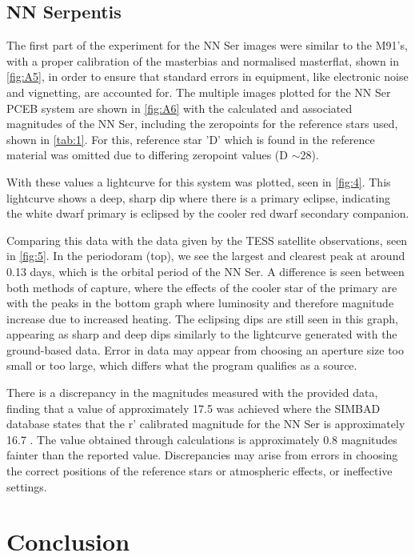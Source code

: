 \documentclass[11pt, a4paper, twocolumn]{article}
\begin{document}
\subsection{NN Serpentis}

The first part of the experiment for the NN Ser images were similar to the M91's, with a proper calibration of the masterbias and normalised masterflat, shown in \autoref{fig:A5}, in order to ensure that standard errors in equipment, like electronic noise and vignetting, are accounted for. The multiple images plotted for the NN Ser PCEB system are shown in \autoref{fig:A6} with the calculated and associated magnitudes of the NN Ser, including the zeropoints for the reference stars used, shown in \autoref{tab:1}. For this, reference star 'D' which is found in the reference material was omitted due to differing zeropoint values (D $\sim$28).

With these values a lightcurve for this system was plotted, seen in \autoref{fig:4}. This lightcurve shows a deep, sharp dip where there is a primary eclipse, indicating the white dwarf primary is eclipsed by the cooler red dwarf secondary companion.

Comparing this data with the data given by the TESS satellite observations, seen in \autoref{fig:5}. In the periodoram (top), we see the largest and clearest peak at around 0.13 days, which is the orbital period of the NN Ser. A difference is seen between both methods of capture, where the effects of the cooler star of the primary are with the peaks in the bottom graph where luminosity and therefore magnitude increase due to increased heating. The eclipsing dips are still seen in this graph, appearing as sharp and deep dips similarly to the lightcurve generated with the ground-based data. Error in data may appear from choosing an aperture size too small or too large, which differs what the program qualifies as a source.

There is a discrepancy in the magnitudes measured with the provided data, finding that a value of approximately 17.5 was achieved where the SIMBAD database states that the r' calibrated magnitude for the NN Ser is approximately 16.7 \cite{2000A&AS..143....9W}. The value obtained through calculations is approximately 0.8 magnitudes fainter than the reported value. Discrepancies may arise from errors in choosing the correct positions of the reference stars or atmospheric effects, or ineffective settings.

\section{Conclusion}
\end{document}

